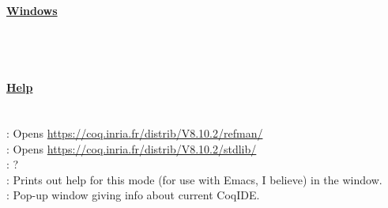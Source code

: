	
~\\
\paragraph{\underline{Windows}}
~\\





	
~\\
\paragraph{\underline{Help}}
~\\
 : Opens \url{https://coq.inria.fr/distrib/V8.10.2/refman/}
\\ 
 : Opens \url{https://coq.inria.fr/distrib/V8.10.2/stdlib/}
\\
 : ? %
\\
 : Prints out help for this mode (for use with Emacs, I believe) in the  window.
\\ 
 : Pop-up window giving info about current CoqIDE.











